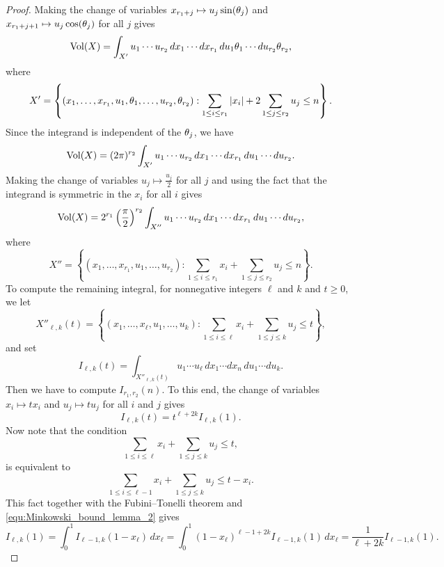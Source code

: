     \begin{proof}
      Making the change of variables $x_{r_{1}+j} \mapsto u_{j}\sin(\theta_{j})$ and $x_{r_{1}+j+1} \mapsto u_{j}\cos(\theta_{j})$ for all $j$ gives
      \[
        \operatorname{\mathrm{Vol}}(X) = \int_{X'}u_{1} \cdots u_{r_{2}}\,dx_{1} \cdots dx_{r_{1}}\,du_{1}\theta_{1} \cdots du_{r_{2}}\theta_{r_{2}},
      \]
      where
      \[
        X' = \left\{(x_{1},\ldots,x_{r_{1}},u_{1},\theta_{1},\ldots,u_{r_{2}},\theta_{r_{2}}):\sum_{1 \le i \le r_{1}}|x_{i}|+2\sum_{1 \le j \le r_{2}}u_{j} \le n\right\}.
      \]
      Since the integrand is independent of the $\theta_{j}$, we have
      \[
        \operatorname{\mathrm{Vol}}(X) = (2\pi)^{r_{2}}\int_{X'}u_{1} \cdots u_{r_{2}}\,dx_{1} \cdots dx_{r_{1}}\,du_{1} \cdots du_{r_{2}}.
      \]
      Making the change of variables $u_{j} \mapsto \frac{u_{j}}{2}$ for all $j$ and using the fact that the integrand is symmetric in the $x_{i}$ for all $i$ gives
      \begin{equation}\label{equ:Minkowski_bound_lemma_1}
        \operatorname{\mathrm{Vol}}(X) = 2^{r_{1}}\left(\frac{\pi}{2}\right)^{r_{2}}\int_{X''}u_{1} \cdots u_{r_{2}}\,dx_{1} \cdots dx_{r_{1}}\,du_{1} \cdots du_{r_{2}},
      \end{equation}
      where
      \[
        X'' = \left\{(x_{1},\ldots,x_{r_{1}},u_{1},\ldots,u_{r_{2}}):\sum_{1 \le i \le r_{1}}x_{i}+\sum_{1 \le j \le r_{2}}u_{j} \le n\right\}.
      \]
      To compute the remaining integral, for nonnegative integers $\ell$ and $k$ and $t \ge 0$, we let
      \[
        X''_{\ell,k}(t) = \left\{(x_{1},\ldots,x_{\ell},u_{1},\ldots,u_{k}):\sum_{1 \le i \le \ell}x_{i}+\sum_{1 \le j \le k}u_{j} \le t\right\},
      \]
      and set 
      \[
        I_{\ell,k}(t) = \int_{X''_{\ell,k}(t)}u_{1} \cdots u_{\ell}\,dx_{1} \cdots dx_{n}\,du_{1} \cdots du_{k}.
      \]
      Then we have to compute $I_{r_{1},r_{2}}(n)$. To this end, the change of variables $x_{i} \mapsto tx_{i}$ and $u_{j} \mapsto tu_{j}$ for all $i$ and $j$ gives
      \begin{equation}\label{equ:Minkowski_bound_lemma_2}
        I_{\ell,k}(t) = t^{\ell+2k}I_{\ell,k}(1).
      \end{equation}
      Now note that the condition
      \[
        \sum_{1 \le i \le \ell}x_{i}+\sum_{1 \le j \le k}u_{j} \le t,
      \]
      is equivalent to
      \[
        \sum_{1 \le i \le \ell-1}x_{i}+\sum_{1 \le j \le k}u_{j} \le t-x_{i}.
      \]
      This fact together with the Fubini–Tonelli theorem and \cref{equ:Minkowski_bound_lemma_2} gives
      \[
        I_{\ell,k}(1) = \int_{0}^{1}I_{\ell-1,k}(1-x_{\ell})\,dx_{\ell} = \int_{0}^{1}(1-x_{\ell})^{\ell-1+2k}I_{\ell-1,k}(1)\,dx_{\ell} = \frac{1}{\ell+2k}I_{\ell-1,k}(1).
\]
\end{proof}
